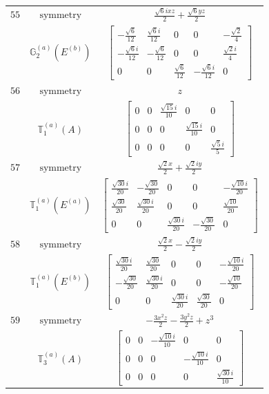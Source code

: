 \documentclass[fleqn,8pt,landscape]{jsarticle}
\begin{document}
\begin{longtable}{ccc}
$ 55 $ & $ \text{symmetry} $ & $ \frac{\sqrt{6} i x z}{2} + \frac{\sqrt{6} y z}{2} $ \\
$  $ & $ \mathbb{G}_{2}^{(a)}(E^{(b)}) $ & $ \begin{bmatrix} - \frac{\sqrt{6}}{12} & \frac{\sqrt{6} i}{12} & 0 & 0 & - \frac{\sqrt{2}}{4} \\ - \frac{\sqrt{6} i}{12} & - \frac{\sqrt{6}}{12} & 0 & 0 & \frac{\sqrt{2} i}{4} \\ 0 & 0 & \frac{\sqrt{6}}{12} & - \frac{\sqrt{6} i}{12} & 0 \end{bmatrix} $ \\ \hline
$ 56 $ & $ \text{symmetry} $ & $ z $ \\
$  $ & $ \mathbb{T}_{1}^{(a)}(A) $ & $ \begin{bmatrix} 0 & 0 & \frac{\sqrt{15} i}{10} & 0 & 0 \\ 0 & 0 & 0 & \frac{\sqrt{15} i}{10} & 0 \\ 0 & 0 & 0 & 0 & \frac{\sqrt{5} i}{5} \end{bmatrix} $ \\ \hline
$ 57 $ & $ \text{symmetry} $ & $ \frac{\sqrt{2} x}{2} + \frac{\sqrt{2} i y}{2} $ \\
$  $ & $ \mathbb{T}_{1}^{(a)}(E^{(a)}) $ & $ \begin{bmatrix} \frac{\sqrt{30} i}{20} & - \frac{\sqrt{30}}{20} & 0 & 0 & - \frac{\sqrt{10} i}{20} \\ \frac{\sqrt{30}}{20} & \frac{\sqrt{30} i}{20} & 0 & 0 & \frac{\sqrt{10}}{20} \\ 0 & 0 & \frac{\sqrt{30} i}{20} & - \frac{\sqrt{30}}{20} & 0 \end{bmatrix} $ \\ \hline
$ 58 $ & $ \text{symmetry} $ & $ \frac{\sqrt{2} x}{2} - \frac{\sqrt{2} i y}{2} $ \\
$  $ & $ \mathbb{T}_{1}^{(a)}(E^{(b)}) $ & $ \begin{bmatrix} \frac{\sqrt{30} i}{20} & \frac{\sqrt{30}}{20} & 0 & 0 & - \frac{\sqrt{10} i}{20} \\ - \frac{\sqrt{30}}{20} & \frac{\sqrt{30} i}{20} & 0 & 0 & - \frac{\sqrt{10}}{20} \\ 0 & 0 & \frac{\sqrt{30} i}{20} & \frac{\sqrt{30}}{20} & 0 \end{bmatrix} $ \\ \hline
$ 59 $ & $ \text{symmetry} $ & $ - \frac{3 x^{2} z}{2} - \frac{3 y^{2} z}{2} + z^{3} $ \\
$  $ & $ \mathbb{T}_{3}^{(a)}(A) $ & $ \begin{bmatrix} 0 & 0 & - \frac{\sqrt{10} i}{10} & 0 & 0 \\ 0 & 0 & 0 & - \frac{\sqrt{10} i}{10} & 0 \\ 0 & 0 & 0 & 0 & \frac{\sqrt{30} i}{10} \end{bmatrix} $ \\ \hline

\end{longtable}
\end{document}
